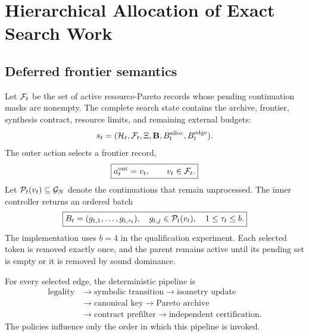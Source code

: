 \section{Hierarchical Allocation of Exact Search Work}

\subsection{Deferred frontier semantics}

Let $\mathcal{F}_t$ be the set of active resource-Pareto records whose pending continuation masks are nonempty. The complete search state contains the archive, frontier, synthesis contract, resource limits, and remaining external budgets:
\begin{equation}
s_t=(\mathcal{H}_t,\mathcal{F}_t,\Xi,\mathbf{B},B_t^{\mathrm{alloc}},B_t^{\mathrm{edge}}).
\end{equation}
The outer action selects a frontier record,
\begin{equation}
\boxed{
a_t^{\mathrm{out}}=v_t,\qquad v_t\in\mathcal{F}_t.
}
\label{eq:outer-action}
\end{equation}
Let $\mathcal{P}_t(v_t)\subseteq\mathcal{G}_N$ denote the continuations that remain unprocessed. The inner controller returns an ordered batch
\begin{equation}
\boxed{
B_t=(g_{t,1},\ldots,g_{t,\tau_t}),
\quad g_{t,j}\in\mathcal{P}_t(v_t),
\quad1\leq\tau_t\leq b.
}
\label{eq:inner-batch}
\end{equation}
The implementation uses $b=4$ in the qualification experiment. Each selected token is removed exactly once, and the parent remains active until its pending set is empty or it is removed by sound dominance.

For every selected edge, the deterministic pipeline is
\begin{equation}
\begin{aligned}
\text{legality}
&\rightarrow\text{symbolic transition}
\rightarrow\text{isometry update}\\
&\rightarrow\text{canonical key}
\rightarrow\text{Pareto archive}\\
&\rightarrow\text{contract prefilter}
\rightarrow\text{independent certification}.
\end{aligned}
\label{eq:exact-pipeline}
\end{equation}
The policies influence only the order in which this pipeline is invoked.

